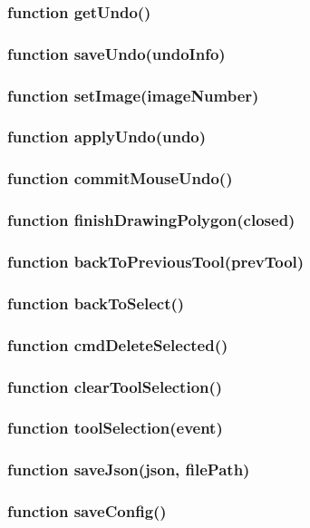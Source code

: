 \subsubsection{function getUndo()}
\subsubsection{function saveUndo(undoInfo)}
\subsubsection{function setImage(imageNumber)}
\subsubsection{function applyUndo(undo)}
\subsubsection{function commitMouseUndo()}
\subsubsection{function finishDrawingPolygon(closed)}
\subsubsection{function backToPreviousTool(prevTool)}
\subsubsection{function backToSelect()}
\subsubsection{function cmdDeleteSelected()}
\subsubsection{function clearToolSelection()}
\subsubsection{function toolSelection(event)}

\subsubsection{function saveJson(json, filePath)}
\subsubsection{function saveConfig()}
